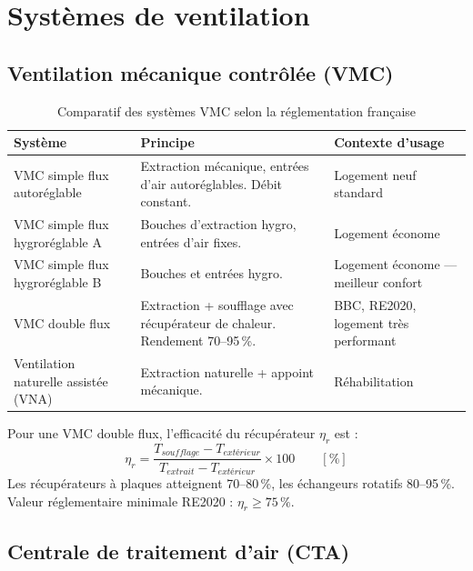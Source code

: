 \section{Systèmes de ventilation}

\subsection{Ventilation mécanique contrôlée (VMC)}

\begin{table}[H]
  \centering
  \caption{Comparatif des systèmes VMC selon la réglementation française}
  \begin{tabular}{p{2.5cm}p{4.5cm}p{4.5cm}}
    \toprule
    Système & Principe & Contexte d'usage \\
    \midrule
    VMC simple flux autoréglable & Extraction mécanique, entrées d'air autoréglables. Débit constant. & Logement neuf standard \\
    VMC simple flux hygroréglable A & Bouches d'extraction hygro, entrées d'air fixes. & Logement économe \\
    VMC simple flux hygroréglable B & Bouches et entrées hygro. & Logement économe — meilleur confort \\
    VMC double flux & Extraction + soufflage avec récupérateur de chaleur. Rendement 70–95\,\%. & BBC, RE2020, logement très performant \\
    Ventilation naturelle assistée (VNA) & Extraction naturelle + appoint mécanique. & Réhabilitation \\
    \bottomrule
  \end{tabular}
\end{table}

\begin{definition}[title=Efficacité du récupérateur de chaleur]
Pour une VMC double flux, l'efficacité du récupérateur $\eta_r$ est :
\begin{equation}
  \eta_r = \frac{T_{soufflage} - T_{extérieur}}{T_{extrait} - T_{extérieur}} \times 100 \qquad [\%]
\end{equation}
Les récupérateurs à plaques atteignent 70–80\,\%, les échangeurs rotatifs 80–95\,\%. Valeur réglementaire minimale RE2020 : $\eta_r \geq 75\,\%$.
\end{definition}

\subsection{Centrale de traitement d'air (CTA)}

